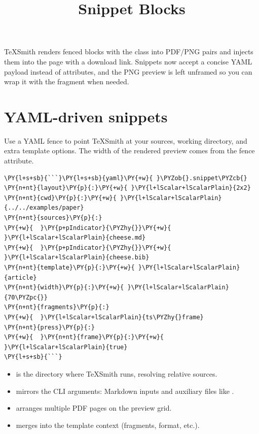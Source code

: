 \documentclass[a4paper,twoside]{article}
\title{Snippet Blocks}
\author{}\date{}
\begin{document}
\maketitle
TeXSmith renders fenced blocks with the  class into PDF/PNG pairs and injects them into the page with a download link. Snippets now accept a concise YAML payload instead of  attributes, and the PNG preview is left unframed so you can wrap it with the  fragment when needed.
\section{YAML-driven snippets}
Use a YAML fence to point TeXSmith at your sources, working directory, and extra template options. The width of the rendered preview comes from the fence attribute.
\begin{tscode}[lang=md, engine=pygments]
\begin{Verbatim}[commandchars=\\\{\},breaklines, breakanywhere, commandchars=\\\{\}]
\PY{l+s+sb}{```}\PY{l+s+sb}{yaml}\PY{+w}{ }\PYZob{}.snippet\PYZcb{}
\PY{n+nt}{layout}\PY{p}{:}\PY{+w}{ }\PY{l+lScalar+lScalarPlain}{2x2}
\PY{n+nt}{cwd}\PY{p}{:}\PY{+w}{ }\PY{l+lScalar+lScalarPlain}{../../examples/paper}
\PY{n+nt}{sources}\PY{p}{:}
\PY{+w}{  }\PY{p+pIndicator}{\PYZhy{}}\PY{+w}{ }\PY{l+lScalar+lScalarPlain}{cheese.md}
\PY{+w}{  }\PY{p+pIndicator}{\PYZhy{}}\PY{+w}{ }\PY{l+lScalar+lScalarPlain}{cheese.bib}
\PY{n+nt}{template}\PY{p}{:}\PY{+w}{ }\PY{l+lScalar+lScalarPlain}{article}
\PY{n+nt}{width}\PY{p}{:}\PY{+w}{ }\PY{l+lScalar+lScalarPlain}{70\PYZpc{}}
\PY{n+nt}{fragments}\PY{p}{:}
\PY{+w}{  }\PY{l+lScalar+lScalarPlain}{ts\PYZhy{}frame}
\PY{n+nt}{press}\PY{p}{:}
\PY{+w}{  }\PY{n+nt}{frame}\PY{p}{:}\PY{+w}{ }\PY{l+lScalar+lScalarPlain}{true}
\PY{l+s+sb}{```}
\end{Verbatim}
\end{tscode}
\begin{itemize}
\item {} is the directory where TeXSmith runs, resolving relative sources.
\item {} mirrors the CLI arguments: Markdown inputs and auxiliary files like .
\item {} arranges multiple PDF pages on the preview grid.
\item {} merges into the template context (fragments, format, etc.).
\end{itemize}
\end{document}
